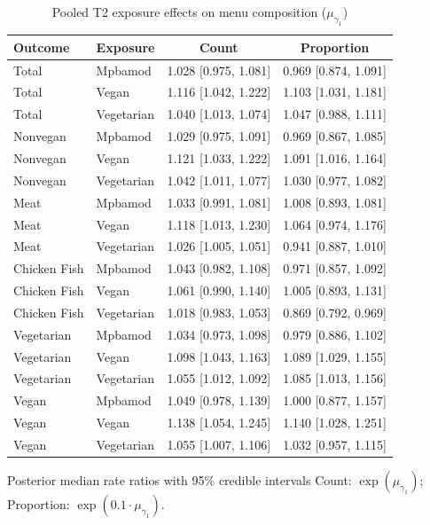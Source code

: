 \begin{table}[H]
\centering
\caption{Pooled T2 exposure effects on menu composition ($\mu_{\gamma_1}$)}
\label{tab:a1_t2_mu_gamma}
\begin{tabular}{llcc}
\toprule
Outcome & Exposure & Count & Proportion \\
\midrule
Total & Mpbamod & 1.028 [0.975, 1.081] & 0.969 [0.874, 1.091] \\
Total & Vegan & 1.116 [1.042, 1.222] & 1.103 [1.031, 1.181] \\
Total & Vegetarian & 1.040 [1.013, 1.074] & 1.047 [0.988, 1.111] \\
Nonvegan & Mpbamod & 1.029 [0.975, 1.091] & 0.969 [0.867, 1.085] \\
Nonvegan & Vegan & 1.121 [1.033, 1.222] & 1.091 [1.016, 1.164] \\
Nonvegan & Vegetarian & 1.042 [1.011, 1.077] & 1.030 [0.977, 1.082] \\
Meat & Mpbamod & 1.033 [0.991, 1.081] & 1.008 [0.893, 1.081] \\
Meat & Vegan & 1.118 [1.013, 1.230] & 1.064 [0.974, 1.176] \\
Meat & Vegetarian & 1.026 [1.005, 1.051] & 0.941 [0.887, 1.010] \\
Chicken Fish & Mpbamod & 1.043 [0.982, 1.108] & 0.971 [0.857, 1.092] \\
Chicken Fish & Vegan & 1.061 [0.990, 1.140] & 1.005 [0.893, 1.131] \\
Chicken Fish & Vegetarian & 1.018 [0.983, 1.053] & 0.869 [0.792, 0.969] \\
Vegetarian & Mpbamod & 1.034 [0.973, 1.098] & 0.979 [0.886, 1.102] \\
Vegetarian & Vegan & 1.098 [1.043, 1.163] & 1.089 [1.029, 1.155] \\
Vegetarian & Vegetarian & 1.055 [1.012, 1.092] & 1.085 [1.013, 1.156] \\
Vegan & Mpbamod & 1.049 [0.978, 1.139] & 1.000 [0.877, 1.157] \\
Vegan & Vegan & 1.138 [1.054, 1.245] & 1.140 [1.028, 1.251] \\
Vegan & Vegetarian & 1.055 [1.007, 1.106] & 1.032 [0.957, 1.115] \\
\bottomrule
\end{tabular}
\par\smallskip\footnotesize Posterior median rate ratios with 95\% credible intervals Count: $\exp(\mu_{\gamma_1})$; Proportion: $\exp(0.1 \cdot \mu_{\gamma_1})$.
\end{table}
